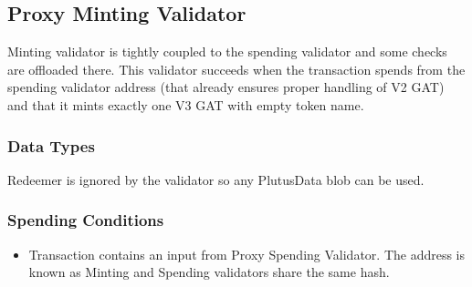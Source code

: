 \documentclass{article}
\begin{document}
\subsection{Proxy Minting Validator}

Minting validator is tightly coupled to the spending validator and some checks are offloaded there. This validator succeeds when the transaction spends from the spending validator address (that already ensures proper handling of V2 GAT) and that it mints exactly one V3 GAT with empty token name.

\subsubsection*{Data Types}

Redeemer is ignored by the validator so any PlutusData blob can be used.

\subsubsection*{Spending Conditions}

\begin{itemize}
  \item Transaction contains an input from Proxy Spending Validator. The address is known as Minting and Spending validators share the same hash.
\end{itemize}
\end{document}

